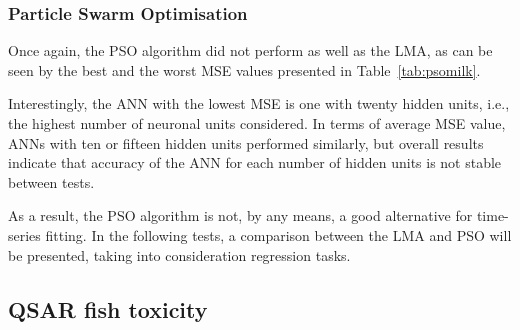 \subsubsection{Particle Swarm Optimisation}

Once again, the PSO algorithm did not perform as well as the LMA, as can be seen by the best and the worst MSE values presented in Table~\ref{tab:psomilk}.

Interestingly, the ANN with the lowest MSE is one with twenty hidden units, i.e., the highest number of neuronal units considered. In terms of average MSE value, ANNs with ten or fifteen hidden units performed similarly, but overall results indicate that accuracy of the ANN for each number of hidden units is not stable between tests.  

\begin{table}[htbp]
\centering
\caption{Summary of the tests performed with the PSO algorithm in the milk production test data set.}
\label{tab:psomilk}
\end{table}

As a result, the PSO algorithm is not, by any means, a good alternative for time-series fitting. In the following tests, a comparison between the LMA and PSO will be presented, taking into consideration regression tasks.

\subsection{QSAR fish toxicity}

